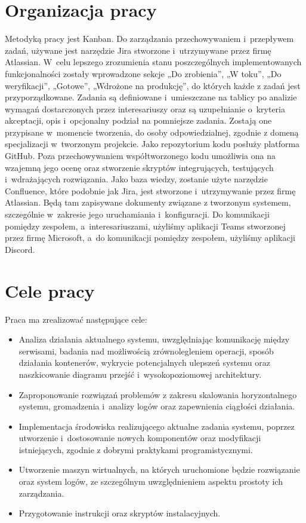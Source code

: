 \section{Organizacja pracy}
\indent Metodyką pracy jest Kanban. Do zarządzania przechowywaniem i~przepływem zadań, używane jest narzędzie Jira stworzone i~utrzymywane przez firmę Atlassian. W~celu lepszego zrozumienia stanu poszczególnych implementowanych funkcjonalności zostały wprowadzone sekcje „Do zrobienia”, „W toku”, „Do weryfikacji”, „Gotowe”, „Wdrożone na produkcję”, do których każde z zadań jest przyporządkowane. Zadania są definiowane i~umieszczane na tablicy po analizie wymagań dostarczonych przez interesariuszy oraz są uzupełnianie o~kryteria akceptacji, opis i~opcjonalny podział na pomniejsze zadania. Zostają one przypisane w~momencie tworzenia, do osoby odpowiedzialnej, zgodnie z domeną specjalizacji w~tworzonym projekcie.
\newline \indent Jako repozytorium kodu posłuży platforma GitHub. Poza przechowywaniem współtworzonego kodu umożliwia ona na wzajemną jego ocenę oraz stworzenie skryptów integrujących, testujących i~wdrażających rozwiązania.
\newline \indent Jako baza wiedzy, zostanie użyte narzędzie Confluence, które podobnie jak Jira, jest stworzone i~utrzymywanie przez firmę Atlassian. Będą tam zapisywane dokumenty związane z tworzonym systemem, szczególnie w~zakresie jego uruchamiania i~konfiguracji.
\newline \indent Do komunikacji pomiędzy zespołem, a~interesariuszami, użyliśmy aplikacji Teams stworzonej przez firmę Microsoft, a~do komunikacji pomiędzy zespołem, użyliśmy aplikacji Discord.

\section{Cele pracy}
\indent Praca ma zrealizować następujące cele:
\begin{itemize}
    \item Analiza działania aktualnego systemu, uwzględniając komunikację między serwisami, badania nad możliwością zrównolegleniem operacji, sposób działania kontenerów, wykrycie potencjalnych ulepszeń systemu oraz naszkicowanie diagramu przejść i~wysokopoziomowej architektury.
    \item Zaproponowanie rozwiązań problemów z zakresu skalowania horyzontalnego systemu, gromadzenia i~analizy logów oraz zapewnienia ciągłości działania.
    \item Implementacja środowiska realizującego aktualne zadania systemu, poprzez utworzenie i~dostosowanie nowych komponentów oraz modyfikacji istniejących, zgodnie z dobrymi praktykami programistycznymi.
    \item Utworzenie maszyn wirtualnych, na których uruchomione będzie rozwiązanie oraz system logów, ze szczególnym uwzględnieniem aspektu prostoty ich zarządzania.
    \item Przygotowanie instrukcji oraz skryptów instalacyjnych.
\end{itemize}
